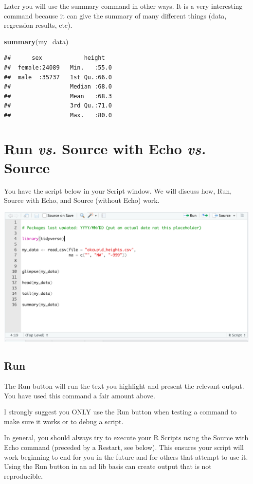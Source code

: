\documentclass[
]{krantz}
\makeatletter
\newenvironment{Shaded}{\begin{snugshade}}{\end{snugshade}}
\newcommand{\KeywordTok}[1]{\textcolor[rgb]{0.27,0.27,0.27}{\textbf{#1}}}
\newcommand{\NormalTok}[1]{#1}
\newenvironment{kframe}{%
\medskip{}
\setlength{\fboxsep}{.8em}
 \def\at@end@of@kframe{}%
 \ifinner\ifhmode%
  \def\at@end@of@kframe{\end{minipage}}%
  \begin{minipage}{\columnwidth}%
 \fi\fi%
 \def\FrameCommand##1{\hskip\@totalleftmargin \hskip-\fboxsep
 \colorbox{shadecolor}{##1}\hskip-\fboxsep
     \hskip-\linewidth \hskip-\@totalleftmargin \hskip\columnwidth}%
 \MakeFramed {\advance\hsize-\width
   \@totalleftmargin\z@ \linewidth\hsize
   \@setminipage}}%
 {\par\unskip\endMakeFramed%
 \at@end@of@kframe}
\renewenvironment{Shaded}{\begin{kframe}}{\end{kframe}}
\makeatother
\begin{document}
Later you will use the summary command in other ways. It is a very interesting command because it can give the summary of many different things (data, regression results, etc).

\begin{Shaded}
\begin{Highlighting}[]
\KeywordTok{summary}\NormalTok{(my_data)}
\end{Highlighting}
\end{Shaded}

\begin{verbatim}
##      sex            height    
##  female:24089   Min.   :55.0  
##  male  :35737   1st Qu.:66.0  
##                 Median :68.0  
##                 Mean   :68.3  
##                 3rd Qu.:71.0  
##                 Max.   :80.0
\end{verbatim}

\hypertarget{run-vs.-source-with-echo-vs.-source}{%
\section{\texorpdfstring{Run \emph{vs.} Source with Echo \emph{vs.} Source}{Run vs. Source with Echo vs. Source}}\label{run-vs.-source-with-echo-vs.-source}}

You have the script below in your Script window. We will discuss how, Run, Source with Echo, and Source (without Echo) work.

\includegraphics[width=0.5\linewidth,height=0.5\textheight]{first_time/images/script_all}

\hypertarget{run}{%
\subsection{Run}\label{run}}

The Run button will run the text you highlight and present the relevant output. You have used this command a fair amount above.

I strongly suggest you ONLY use the Run button when testing a command to make sure it works or to debug a script.

In general, you should always try to execute your R Scripts using the Source with Echo command (preceded by a Restart, see below). This ensures your script will work beginning to end for you in the future and for others that attempt to use it. Using the Run button in an ad lib basis can create output that is not reproducible.
\end{document}
